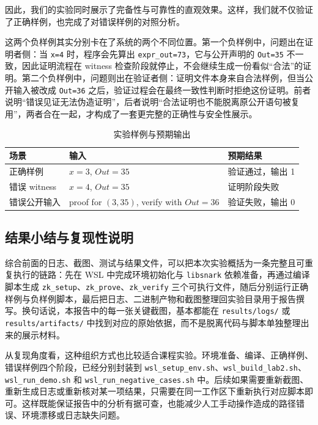 \documentclass[UTF8,a4paper,10pt]{ctexart}
\begin{document}
因此，我们的实验同时展示了完备性与可靠性的直观效果。这样，我们就不仅验证了正确样例，也完成了对错误样例的对照分析。

这两个负样例其实分别卡在了系统的两个不同位置。第一个负样例中，问题出在证明者侧：当 \texttt{x=4} 时，程序会先算出 \texttt{expr\_out=73}，它与公开声明的 \texttt{Out=35} 不一致，因此证明流程在 witness 检查阶段就停止，不会继续生成一份看似“合法”的证明。第二个负样例中，问题则出在验证者侧：证明文件本身来自合法样例，但当公开输入被改成 \texttt{Out=36} 之后，验证过程会在最终一致性判断时拒绝这份证明。前者说明“错误见证无法伪造证明”，后者说明“合法证明也不能脱离原公开语句被复用”，两者合在一起，才构成了一套更完整的正确性与安全性展示。

\begin{table}[H]
    \centering
    \begin{tabular}{lll}
        \toprule
        场景 & 输入 & 预期结果 \\
        \midrule
        正确样例 & $x=3$, $Out=35$ & 验证通过，输出 1 \\
        错误 witness & $x=4$, $Out=35$ & 证明阶段失败 \\
        错误公开输入 & proof for $(3,35)$, verify with $Out=36$ & 验证失败，输出 0 \\
        \bottomrule
    \end{tabular}
    \caption{实验样例与预期输出}
\end{table}

\subsection{结果小结与复现性说明}
综合前面的日志、截图、测试与结果文件，可以把本次实验概括为一条完整且可重复执行的链路：先在 WSL 中完成环境初始化与 \texttt{libsnark} 依赖准备，再通过编译脚本生成 \texttt{zk\_setup}、\texttt{zk\_prove}、\texttt{zk\_verify} 三个可执行文件，随后分别运行正确样例与负样例脚本，最后把日志、二进制产物和截图整理回实验目录用于报告撰写。换句话说，本报告中的每一张关键截图，基本都能在 \texttt{results/logs/} 或 \texttt{results/artifacts/} 中找到对应的原始依据，而不是脱离代码与脚本单独整理出来的展示材料。

从复现角度看，这种组织方式也比较适合课程实验。环境准备、编译、正确样例、错误样例四个阶段，已经分别封装到 \texttt{wsl\_setup\_env.sh}、\texttt{wsl\_build\_lab2.sh}、\texttt{wsl\_run\_demo.sh} 和 \texttt{wsl\_run\_negative\_cases.sh} 中。后续如果需要重新截图、重新生成日志或重新核对某一项结果，只需要在同一工作区下重新执行对应脚本即可。这样既能保证报告中的分析有据可查，也能减少人工手动操作造成的路径错误、环境漂移或日志缺失问题。
\end{document}
